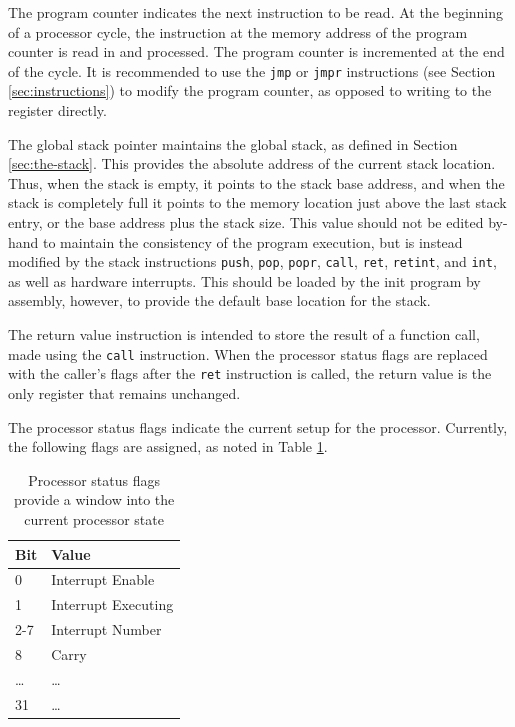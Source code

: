 \documentclass{article}
\begin{document}
The program counter indicates the next instruction to be read. At the beginning of a processor cycle, the instruction at the memory address of the program counter is read in and processed. The program counter is incremented at the end of the cycle. It is recommended to use the \texttt{jmp} or \texttt{jmpr} instructions (see Section \ref{sec:instructions}) to modify the program counter, as opposed to writing to the register directly.

The global stack pointer maintains the global stack, as defined in Section \ref{sec:the-stack}. This provides the absolute address of the current stack location. Thus, when the stack is empty, it points to the stack base address, and when the stack is completely full it points to the memory location just above the last stack entry, or the base address plus the stack size. This value should not be edited by-hand to maintain the consistency of the program execution, but is instead modified by the stack instructions \texttt{push}, \texttt{pop}, \texttt{popr}, \texttt{call}, \texttt{ret}, \texttt{retint}, and \texttt{int}, as well as hardware interrupts. This should be loaded by the init program by assembly, however, to provide the default base location for the stack.

The return value instruction is intended to store the result of a function call, made using the \texttt{call} instruction. When the processor status flags are replaced with the caller's flags after the \texttt{ret} instruction is called, the return value is the only register that remains unchanged.

The processor status flags indicate the current setup for the processor. Currently, the following flags are assigned, as noted in Table \ref{table:processor-flags}.

\begin{table}[h!]
    \centering
    \begin{tabular}{l|l}
        \hline
        Bit & Value \\
        \hline
        0 & Interrupt Enable \\
        1 & Interrupt Executing \\
        2-7 & Interrupt Number \\
        8 & Carry \\
        \dots & \dots \\
        31 & \dots \\
        \hline
    \end{tabular}
    \caption{Processor status flags provide a window into the current processor state}
    \label{table:processor-flags}
\end{table}
\end{document}
